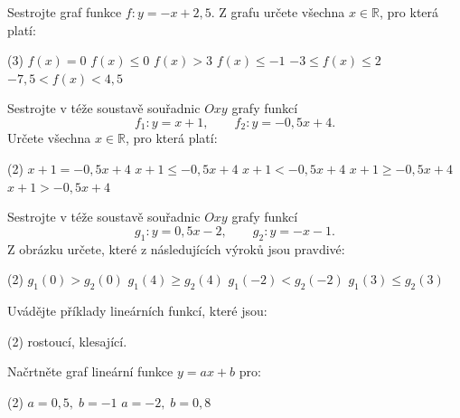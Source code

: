 \documentclass[12pt,a4paper]{article}
\begin{document}
\begin{exercise}
    Sestrojte graf funkce $f\colon y=-x+2{,}5$. Z grafu určete všechna $x\in\mathbb{R}$, pro která platí:
    \begin{tasks}(3)
        \task $f(x)=0$
        \task $f(x)\le 0$
        \task $f(x)>3$
        \task $f(x)\le -1$
        \task $-3\le f(x)\le 2$
        \task $-7{,}5<f(x)<4{,}5$
    \end{tasks}
\end{exercise}


\begin{exercise}
    Sestrojte v téže soustavě souřadnic $Oxy$ grafy funkcí
    \[
        f_{1}\colon y=x+1,\qquad f_{2}\colon y=-0{,}5x+4.
    \]
    Určete všechna $x\in\mathbb{R}$, pro která platí:
    \begin{tasks}(2)
        \task $x+1=-0{,}5x+4$
        \task $x+1\le -0{,}5x+4$
        \task $x+1< -0{,}5x+4$
        \task $x+1\ge -0{,}5x+4$
        \task $x+1> -0{,}5x+4$
    \end{tasks}
\end{exercise}


\begin{exercise}
    Sestrojte v téže soustavě souřadnic $Oxy$ grafy funkcí
    \[
        g_{1}\colon y=0{,}5x-2,\qquad g_{2}\colon y=-x-1.
    \]
    Z obrázku určete, které z následujících výroků jsou pravdivé:
    \begin{tasks}(2)
        \task $g_{1}(0)>g_{2}(0)$
        \task $g_{1}(4)\ge g_{2}(4)$
        \task $g_{1}(-2)<g_{2}(-2)$
        \task $g_{1}(3)\le g_{2}(3)$
    \end{tasks}
\end{exercise}


\begin{exercise}
    Uvádějte příklady lineárních funkcí, které jsou:
    \begin{tasks}(2)
        \task rostoucí,
        \task klesající.
    \end{tasks}
\end{exercise}


\begin{exercise}
    Načrtněte graf lineární funkce $y=ax+b$ pro:
    \begin{tasks}(2)
        \task $a=0{,}5,\; b=-1$
        \task $a=-2,\; b=0{,}8$
    \end{tasks}
\end{exercise}
\end{document}
